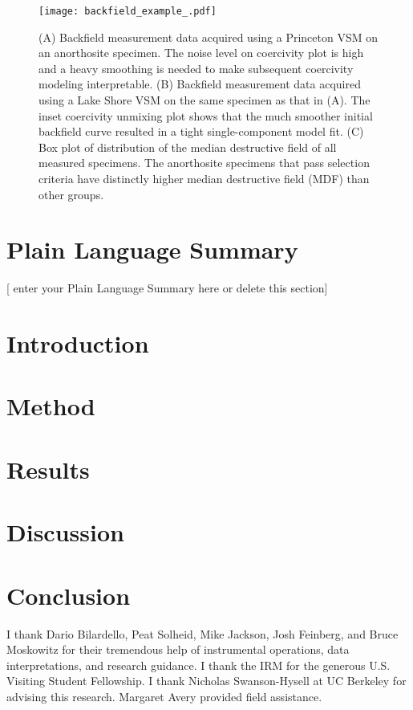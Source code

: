 \documentclass[draft]{agujournal2019}
\begin{document}
\begin{figure}
\begin{center}
	\noindent\texttt{[image: backfield\_example\_.pdf]}
\end{center}
\caption{\small{(A) Backfield measurement data acquired using a Princeton VSM on an anorthosite specimen. The noise level on coercivity plot is high and a heavy smoothing is needed to make subsequent coercivity modeling interpretable. (B) Backfield measurement data acquired using a Lake Shore VSM on the same specimen as that in (A). The inset coercivity unmixing plot shows that the much smoother initial backfield curve resulted in a tight single-component model fit. (C) Box plot of distribution of the median destructive field of all measured specimens. The anorthosite specimens that pass selection criteria have distinctly higher median destructive field (MDF) than other groups.}}
\label{fig:backfield}
\end{figure}



\begin{abstract}

\end{abstract}

\section*{Plain Language Summary}
[ enter your Plain Language Summary here or delete this section]




\section{Introduction}

\section{Method}

\section{Results}

\section{Discussion}

\section{Conclusion}

\acknowledgments
I thank Dario Bilardello, Peat Solheid, Mike Jackson, Josh Feinberg, and Bruce Moskowitz for their tremendous help of instrumental operations, data interpretations, and research guidance. I thank the IRM for the generous U.S. Visiting Student Fellowship. I thank Nicholas Swanson-Hysell at UC Berkeley for advising this research. Margaret Avery provided field assistance.



\end{document}
